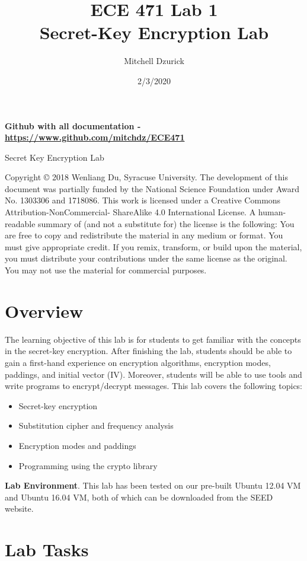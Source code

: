 \documentclass[12pt]{article}
\title {{\bf ECE 471 Lab 1} \\
\large{Secret-Key Encryption Lab}}
\author{Mitchell Dzurick}
\date{2/3/2020}
\begin{document}
\maketitle
\textbf{Github with all documentation - \url{https://www.github.com/mitchdz/ECE471}}
\tableofcontents 

\clearpage


Secret Key Encryption Lab

Copyright © 2018 Wenliang Du, Syracuse University. The development of this document was partially funded by the National
Science Foundation under Award No. 1303306 and 1718086. This work is licensed under a Creative Commons
Attribution-NonCommercial- ShareAlike 4.0 International License. A human-readable summary of (and not a substitute for)
the license is the following: You are free to copy and redistribute the material in any medium or format. You must give
appropriate credit. If you remix, transform, or build upon the material, you must distribute your contributions under the
same license as the original. You may not use the material for commercial purposes.

\section{Overview}

The learning objective of this lab is for students to get familiar with the concepts in the secret-key encryption. After
finishing the lab, students should be able to gain a first-hand experience on encryption algorithms, encryption modes,
paddings, and initial vector (IV). Moreover, students will be able to use tools and write programs to encrypt/decrypt
messages. This lab covers the following topics:

    \begin{itemize}
        \item Secret-key encryption
        \item Substitution cipher and frequency analysis
        \item Encryption modes and paddings
        \item Programming using the crypto library
    \end{itemize}

\textbf{Lab Environment}. This lab has been tested on our pre-built Ubuntu 12.04 VM and Ubuntu 16.04 VM, both of which
can be downloaded from the SEED website.

\clearpage

\section{Lab Tasks}
\clearpage
\end{document}
